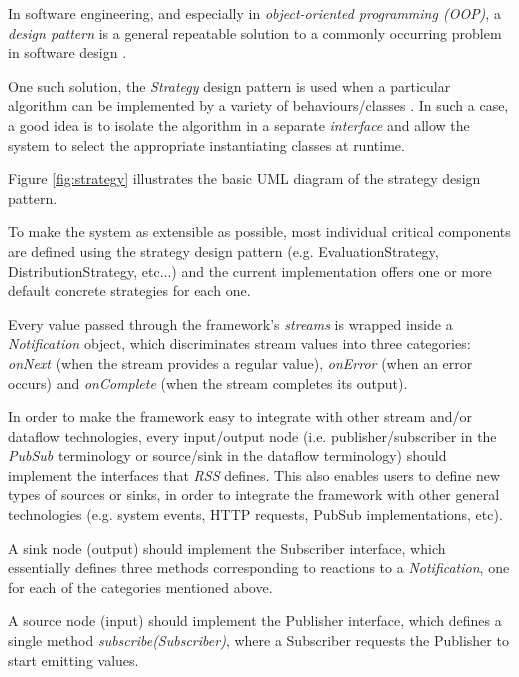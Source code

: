 \documentclass{dithesis}
\begin{document}

In software engineering, and especially in \textit{object-oriented programming (OOP)}, a \textit{design pattern} is a general repeatable solution to a commonly occurring problem in software design \cite{design}.

One such solution, the \textit{Strategy} design pattern is used when a particular algorithm can be implemented by a variety of behaviours/classes \cite{design}. In such a case, a good idea is to isolate the algorithm in a separate \textit{interface} and allow the system to select the appropriate instantiating classes at runtime.

Figure \ref{fig:strategy} illustrates the basic UML diagram of the strategy design pattern.

To make the system as extensible as possible, most individual critical components are defined using the strategy design pattern (e.g. EvaluationStrategy, DistributionStrategy, etc...) and the current implementation offers one or more default concrete strategies for each one.


Every value passed through the framework's \textit{streams} is wrapped inside a \textit{Notification} object, which discriminates stream values into three categories: \textit{onNext} (when the stream provides a regular value), \textit{onError} (when an error occurs) and \textit{onComplete} (when the stream completes its output).

 \label{external}
In order to make the framework easy to integrate with other stream and/or dataflow technologies, every input/output node (i.e. publisher/subscriber in the \textit{PubSub} terminology or source/sink in the dataflow terminology) should implement the interfaces that \textit{RSS} defines. This also enables users to define new types of sources or sinks, in order to integrate the framework with other general technologies (e.g. system events, HTTP requests, PubSub implementations, etc).

A sink node (output) should implement the Subscriber interface, which essentially defines three methods corresponding to reactions to a \textit{Notification}, one for each of the categories mentioned above. 

A source node (input) should implement the Publisher interface, which defines a single method \textit{subscribe(Subscriber)}, where a Subscriber requests the Publisher to start emitting values. 
\end{document}
